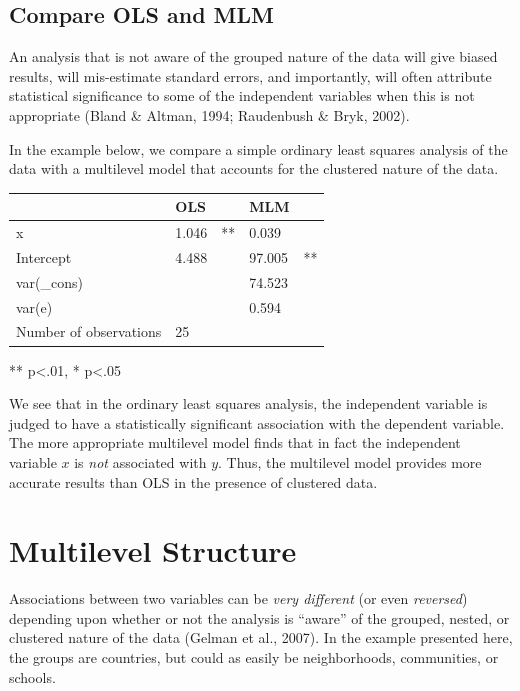 \documentclass[
  letterpaper,
  DIV=11,
  numbers=noendperiod]{scrreprt}
\begin{document}
\subsection{Compare OLS and MLM}\label{compare-ols-and-mlm}

An analysis that is not aware of the grouped nature of the data will
give biased results, will mis-estimate standard errors, and importantly,
will often attribute statistical significance to some of the independent
variables when this is not appropriate (Bland \& Altman, 1994;
Raudenbush \& Bryk, 2002). 

In the example below, we compare a simple ordinary least squares
analysis of the data with a multilevel model that accounts for the
clustered nature of the data.

\begin{longtable}[]{@{}lllll@{}}
\toprule\noalign{}
& OLS & & MLM & \\
\midrule\noalign{}
\endhead
\bottomrule\noalign{}
\endlastfoot
x & 1.046 & ** & 0.039 & \\
Intercept & 4.488 & & 97.005 & ** \\
var(\_cons) & & & 74.523 & \\
var(e) & & & 0.594 & \\
Number of observations & 25 & & & \\
\end{longtable}

** p\textless.01, * p\textless.05

We see that in the ordinary least squares analysis, the independent
variable is judged to have a statistically significant association with
the dependent variable. The more appropriate multilevel model finds that
in fact the independent variable \(x\) is \emph{not} associated with
\(y\). Thus, the multilevel model provides more accurate results than
OLS in the presence of clustered data.

\section{Multilevel Structure}\label{sec-multilevelstructure}

Associations between two variables can be \emph{very different} (or even
\emph{reversed}) depending upon whether or not the analysis is ``aware''
of the grouped, nested, or clustered nature of the data (Gelman et al.,
2007). In the example presented here, the groups are countries, but
could as easily be neighborhoods, communities, or schools.
\end{document}

